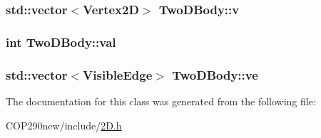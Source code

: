 \subsubsection[{\texorpdfstring{v}{v}}]{\setlength{\rightskip}{0pt plus 5cm}std\+::vector$<${\bf Vertex2D}$>$ Two\+D\+Body\+::v}\hypertarget{class_two_d_body_a28003130b9cd049b6ab0c750af18a7a0}{}\label{class_two_d_body_a28003130b9cd049b6ab0c750af18a7a0}
\subsubsection[{\texorpdfstring{val}{val}}]{\setlength{\rightskip}{0pt plus 5cm}int Two\+D\+Body\+::val}\hypertarget{class_two_d_body_aa4bbe91c010e5547c9904590ad8d53b6}{}\label{class_two_d_body_aa4bbe91c010e5547c9904590ad8d53b6}
\subsubsection[{\texorpdfstring{ve}{ve}}]{\setlength{\rightskip}{0pt plus 5cm}std\+::vector$<${\bf Visible\+Edge}$>$ Two\+D\+Body\+::ve}\hypertarget{class_two_d_body_ac7b38febf4667a16f07ff25b35bd818d}{}\label{class_two_d_body_ac7b38febf4667a16f07ff25b35bd818d}


The documentation for this class was generated from the following file\+:\begin{DoxyCompactItemize}
\item 
C\+O\+P290new/include/\hyperlink{2_d_8h}{2\+D.\+h}\end{DoxyCompactItemize}
